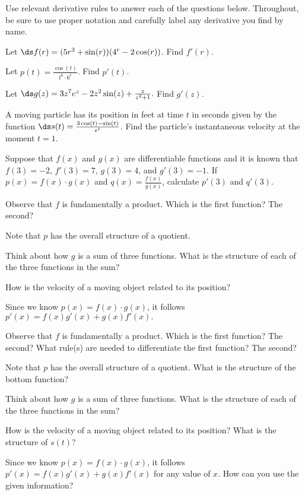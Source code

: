 \begin{activity} \label{A:2.3.3} Use relevant derivative rules to answer each of the questions below.  Throughout, be sure to use proper notation and carefully label any derivative you find by name.  
\ba
	\item Let $\ds f(r) = (5r^3 + \sin(r))(4^r - 2\cos(r))$.  Find $f'(r)$.  
	\item Let $\displaystyle p(t) = \frac{\cos(t)}{t^6 \cdot 6^t}$.  Find $p'(t)$.
	\item Let $\ds g(z) = 3z^7 e^z - 2z^2 \sin(z) + \frac{z}{z^2 + 1}.$  Find $g'(z)$.
	\item A moving particle has its position in feet at time $t$ in seconds given by the function $\ds s(t) = \frac{3\cos(t) - \sin(t)}{e^t}$.  Find the particle's instantaneous velocity at the moment $t = 1$.
	\item Suppose that $f(x)$ and $g(x)$ are differentiable functions and it is known that $f(3) = -2$, $f'(3) = 7$, $g(3) = 4$, and  $g'(3) = -1$.  If $p(x) = f(x) \cdot g(x)$ and $\displaystyle q(x) = \frac{f(x)}{g(x)}$, calculate $p'(3)$ and $q'(3)$.
\ea
\end{activity}
\begin{smallhint}
\ba
	\item Observe that $f$ is fundamentally a product.  Which is the first function?  The second?  
	\item Note that $p$ has the overall structure of a quotient.
	\item Think about how $g$ is a sum of three functions.  What is the structure of each of the three functions in the sum?
	\item How is the velocity of a moving object related to its position?
	\item Since we know $p(x) = f(x) \cdot g(x)$, it follows $p'(x) = f(x) g'(x) + g(x) f'(x).$
\ea
\end{smallhint}
\begin{bighint}
\ba
	\item Observe that $f$ is fundamentally a product.  Which is the first function?  The second?  What rule(s) are needed to differentiate the first function?  The second? 
	\item Note that $p$ has the overall structure of a quotient.  What is the structure of the bottom function?
	\item Think about how $g$ is a sum of three functions.  What is the structure of each of the three functions in the sum?
	\item How is the velocity of a moving object related to its position?  What is the structure of $s(t)$?
	\item Since we know $p(x) = f(x) \cdot g(x)$, it follows $p'(x) = f(x) g'(x) + g(x) f'(x)$ for any value of $x$.  How can you use the given information?
\ea
\end{bighint}
